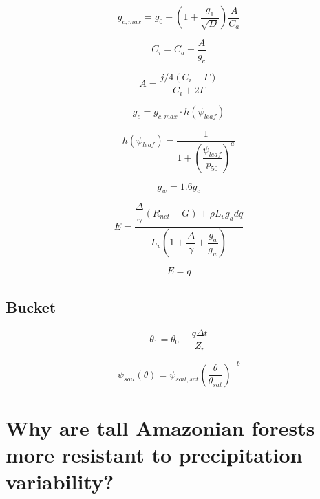 \documentclass[11pt]{article}
\begin{document}
\begin{equation}
g_{c,max} = g_0 + \left(1+\dfrac{g_1}{\sqrt{D}}\right)\dfrac{A}{C_a}
\end{equation}

\begin{equation}
C_i = C_a - \dfrac{A}{g_c}
\end{equation}

\begin{equation}
A = \dfrac{j/4\left(C_i-\Gamma\right)}{C_i+2\Gamma}
\end{equation}

\begin{equation}
g_c = g_{c,max}\cdot h\left(\psi_{leaf}\right)
\end{equation}

\begin{equation}
h\left(\psi_{leaf}\right) = 
\dfrac{1}{
1+\left(\dfrac{\psi_{leaf}}{p_{50}}\right)^a
}
\end{equation}


\begin{equation}
g_w = 1.6g_c
\end{equation}

\begin{equation}
E = \dfrac{\dfrac{\Delta}{\gamma}\left(R_{net}-G\right)+\rho L_v g_a dq}
{L_v\left(1+\dfrac{\Delta}{\gamma}+\dfrac{g_a}{g_w}\right)}
\end{equation}

\begin{equation}
E = q
\end{equation}

\subsection{Bucket}

\begin{equation}
\theta_1 = \theta_0 - \dfrac{q\Delta t}{Z_r}
\end{equation}

\begin{equation}
\psi_{soil}\left(\theta\right) = \psi_{soil,sat}\left(\dfrac{\theta}{\theta_{sat}}\right)^{-b}
\end{equation}


\newpage
\section{Why are tall Amazonian forests more resistant to precipitation variability?}
\end{document}
